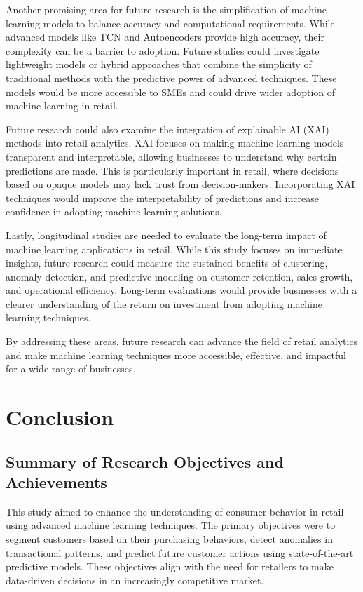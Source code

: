 \documentclass[12pt, a4paper,twoside]{report}
\theoremstyle{plain} %
\theoremstyle{definition} %
\theoremstyle{remark} %
\numberwithin{equation}{chapter}
\begin{document}
Another promising area for future research is the simplification of machine learning models to balance accuracy and computational requirements. While advanced models like TCN and Autoencoders provide high accuracy, their complexity can be a barrier to adoption. Future studies could investigate lightweight models or hybrid approaches that combine the simplicity of traditional methods with the predictive power of advanced techniques. These models would be more accessible to SMEs and could drive wider adoption of machine learning in retail.

Future research could also examine the integration of explainable AI (XAI) methods into retail analytics. XAI focuses on making machine learning models transparent and interpretable, allowing businesses to understand why certain predictions are made. This is particularly important in retail, where decisions based on opaque models may lack trust from decision-makers. Incorporating XAI techniques would improve the interpretability of predictions and increase confidence in adopting machine learning solutions.

Lastly, longitudinal studies are needed to evaluate the long-term impact of machine learning applications in retail. While this study focuses on immediate insights, future research could measure the sustained benefits of clustering, anomaly detection, and predictive modeling on customer retention, sales growth, and operational efficiency. Long-term evaluations would provide businesses with a clearer understanding of the return on investment from adopting machine learning techniques.

By addressing these areas, future research can advance the field of retail analytics and make machine learning techniques more accessible, effective, and impactful for a wide range of businesses.


\chapter{Conclusion}
\section{Summary of Research Objectives and Achievements}

This study aimed to enhance the understanding of consumer behavior in retail using advanced machine learning techniques. The primary objectives were to segment customers based on their purchasing behaviors, detect anomalies in transactional patterns, and predict future customer actions using state-of-the-art predictive models. These objectives align with the need for retailers to make data-driven decisions in an increasingly competitive market.
\end{document}
